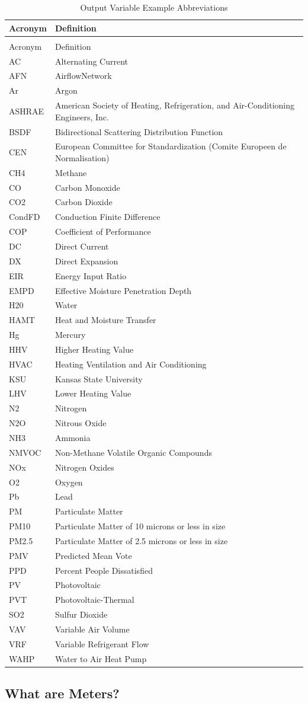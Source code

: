 \begin{longtable}[c]{p{1.5in}p{4.5in}}
\caption{Output Variable Example Abbreviations \label{table:output-variable-example-abbreviations}} \tabularnewline
\toprule 
Acronym & Definition \tabularnewline
\midrule
\endfirsthead

\caption[]{Output Variable Example Abbreviations} \tabularnewline
\toprule 
Acronym & Definition \tabularnewline
\midrule
\endhead
AC & Alternating Current\tabularnewline
AFN & AirflowNetwork\tabularnewline
Ar & Argon\tabularnewline
ASHRAE & American Society of Heating, Refrigeration, and Air-Conditioning Engineers, Inc.\tabularnewline
BSDF & Bidirectional Scattering Distribution Function\tabularnewline
CEN & European Committee for Standardization (Comite Europeen de Normalisation)\tabularnewline
CH4 & Methane\tabularnewline
CO & Carbon Monoxide\tabularnewline
CO2 & Carbon Dioxide\tabularnewline
CondFD & Conduction Finite Difference\tabularnewline
COP & Coefficient of Performance\tabularnewline
DC & Direct Current\tabularnewline
DX & Direct Expansion\tabularnewline
EIR & Energy Input Ratio\tabularnewline
EMPD & Effective Moisture Penetration Depth\tabularnewline
H20 & Water\tabularnewline
HAMT & Heat and Moisture Transfer\tabularnewline
Hg & Mercury\tabularnewline
HHV & Higher Heating Value\tabularnewline
HVAC & Heating Ventilation and Air Conditioning\tabularnewline
KSU & Kansas State University\tabularnewline
LHV & Lower Heating Value\tabularnewline
N2 & Nitrogen\tabularnewline
N2O & Nitrous Oxide\tabularnewline
NH3 & Ammonia\tabularnewline
NMVOC & Non-Methane Volatile Organic Compounds\tabularnewline
NOx & Nitrogen Oxides\tabularnewline
O2 & Oxygen\tabularnewline
Pb & Lead\tabularnewline
PM & Particulate Matter\tabularnewline
PM10 & Particulate Matter of 10 microns or less in size\tabularnewline
PM2.5 & Particulate Matter of 2.5 microns or less in size\tabularnewline
PMV & Predicted Mean Vote\tabularnewline
PPD & Percent People Dissatisfied\tabularnewline
PV & Photovoltaic\tabularnewline
PVT & Photovoltaic-Thermal\tabularnewline
SO2 & Sulfur Dioxide\tabularnewline
VAV & Variable Air Volume\tabularnewline
VRF & Variable Refrigerant Flow\tabularnewline
WAHP & Water to Air Heat Pump\tabularnewline
\bottomrule
\end{longtable}


\subsection{What are Meters?}\label{what-are-meters}

